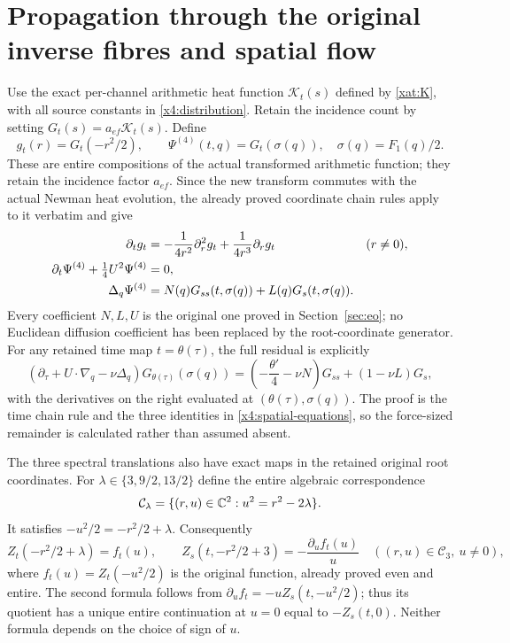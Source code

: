\section{Propagation through the original inverse fibres and spatial flow}
\label{sec:x4-spatial}

Use the exact per-channel arithmetic heat function $\mathcal K_t(s)$
defined by \eqref{xat:K}, with all source constants in
\eqref{x4:distribution}. Retain the incidence count by setting
$G_t(s)=a_{ef}\mathcal K_t(s)$. Define
\[
g_t(r)=G_t(-r^2/2),\qquad
\Psi^{(4)}(t,q)=G_t(\sigma(q)),\quad\sigma(q)=F_1(q)/2.
\]
These are entire compositions of the actual transformed arithmetic
function; they retain the incidence factor $a_{ef}$. Since the new
transform commutes with the actual Newman heat evolution, the already
proved coordinate chain rules apply to it verbatim and give
\begin{align}
\partial_tg_t&=
 -\frac1{4r^2}\partial_r^2g_t+\frac1{4r^3}\partial_rg_t
                       &&(r\ne0),\notag\\
\partial_t\Psi^{(4)}+\tfrac14U^2\Psi^{(4)}&=0,\notag\\
\Delta_q\Psi^{(4)}&=N(q)G_{ss}(t,\sigma(q))+
                              L(q)G_s(t,\sigma(q)).
\label{x4:spatial-equations}
\end{align}
Every coefficient $N,L,U$ is the original one proved in
Section~\ref{sec:eo}; no Euclidean diffusion coefficient has been
replaced by the root-coordinate generator. For any retained time map
$t=\theta(\tau)$, the full residual is explicitly
\[
(\partial_\tau+U\cdot\nabla_q-\nu\Delta_q)
 G_{\theta(\tau)}(\sigma(q))
=\left(-\frac{\theta'}4-\nu N\right)G_{ss}
                         +(1-\nu L)G_s,
\]
with the derivatives on the right evaluated at
$(\theta(\tau),\sigma(q))$. The proof is the time chain rule and the
three identities in \eqref{x4:spatial-equations}, so the force-sized
remainder is calculated rather than assumed absent.

The three spectral translations also have exact maps in the retained
original root coordinates. For
$\lambda\in\{3,9/2,13/2\}$ define the entire algebraic correspondence
\[
\mathcal C_\lambda=\{(r,u)\in\mathbb C^2:u^2=r^2-2\lambda\}.
\]
It satisfies $-u^2/2=-r^2/2+\lambda$. Consequently
\[
Z_t(-r^2/2+\lambda)=f_t(u),\qquad
Z_s(t,-r^2/2+3)=-\frac{\partial_uf_t(u)}u
                 \quad ((r,u)\in\mathcal C_3,\ u\ne0),
\]
where $f_t(u)=Z_t(-u^2/2)$ is the original function, already proved
even and entire. The second formula follows from
$\partial_uf_t=-uZ_s(t,-u^2/2)$; thus its quotient has a unique
entire continuation at $u=0$ equal to $-Z_s(t,0)$. Neither formula
depends on the choice of sign of $u$.

